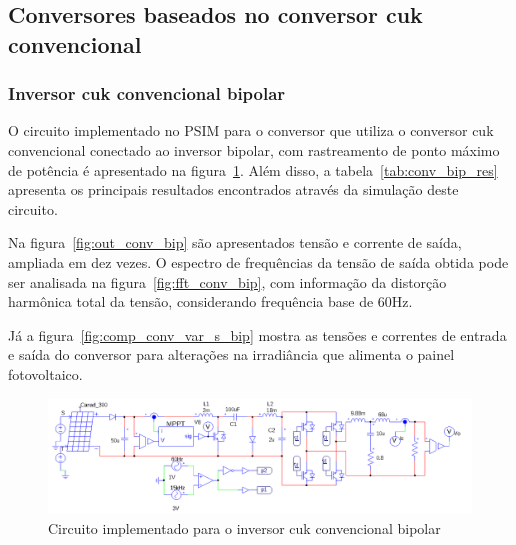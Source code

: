 \documentclass[
	12pt,				%
	openright,			%
	twoside,			%
	a4paper,			%
	english,			%
	french,				%
	spanish,			%
	brazil,				%
	]{abntex2}
\begin{document}
\subsection{Conversores baseados no conversor cuk convencional}
\subsubsection{Inversor cuk convencional bipolar}

O circuito implementado no PSIM para o conversor que utiliza o conversor cuk convencional conectado ao inversor bipolar, com rastreamento de ponto máximo de potência é apresentado na figura~\ref{fig:comp_conv_circ_clean}. Além disso, a tabela~\ref{tab:conv_bip_res} apresenta os principais resultados encontrados através da simulação deste circuito.

Na figura~\ref{fig:out_conv_bip} são apresentados tensão e corrente de saída, ampliada em dez vezes. O espectro de frequências da tensão de saída obtida pode ser analisada na figura~\ref{fig:fft_conv_bip},  com informação da distorção harmônica total da tensão, considerando frequência base de 60Hz.

Já a figura~\ref{fig:comp_conv_var_s_bip} mostra as tensões e correntes de entrada e saída do conversor para alterações na irradiância que alimenta o painel fotovoltaico.

\begin{figure}[H]%
	\captionsetup{justification=centering}
	\centering
		\includegraphics[width= \linewidth]{comp_conv_circ_clean}
		\caption{Circuito implementado para o inversor cuk convencional bipolar}
		\label{fig:comp_conv_circ_clean}
\end{figure}
\end{document}
